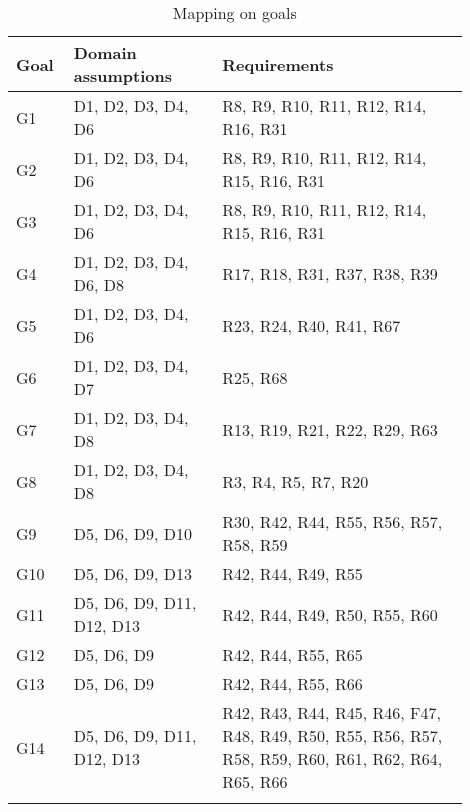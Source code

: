 \begin{center}
    \begin{longtable}[H]{|p{0.1\linewidth}|p{0.3\linewidth}|p{0.5\linewidth}|}
     \hline
     \textbf{Goal} & \textbf{Domain assumptions} & \textbf{Requirements}\\
     \hline
     G1 & D1, D2, D3, D4, D6 
        & R8, R9, R10, R11, R12, R14, R16, R31\\
     \hline
     G2 & D1, D2, D3, D4, D6  
        & R8, R9, R10, R11, R12, R14, R15, R16, R31\\
     \hline
     G3 & D1, D2, D3, D4, D6 
        & R8, R9, R10, R11, R12, R14, R15, R16, R31\\
     \hline
     G4 & D1, D2, D3, D4, D6, D8 
        & R17, R18, R31, R37, R38, R39 \\
     \hline
     G5 & D1, D2, D3, D4, D6 
        & R23, R24, R40, R41, R67\\
     \hline
     G6 & D1, D2, D3, D4, D7 
        & R25, R68\\
     \hline
     G7 & D1, D2, D3, D4, D8
        & R13, R19, R21, R22, R29, R63\\
     \hline
     G8 & D1, D2, D3, D4, D8
        & R3, R4, R5, R7, R20\\
     \hline
     G9 & D5, D6, D9, D10
        & R30, R42, R44, R55, R56, R57, R58, R59\\
     \hline
     G10 & D5, D6, D9, D13
        & R42, R44, R49, R55\\
     \hline
     G11 & D5, D6, D9, D11, D12, D13
        & R42, R44, R49, R50, R55, R60\\
     \hline
      G12 & D5, D6, D9
        & R42, R44, R55, R65\\
     \hline
      G13 & D5, D6, D9
        & R42, R44, R55, R66\\
     \hline
     G14 & D5, D6, D9, D11, D12, D13
        & R42, R43, R44, R45, R46, F47, R48, R49, R50, R55, R56, R57, R58, R59, R60, R61, R62, R64, R65, R66 \\
     \hline
    \caption{Mapping on goals}
    \label{tab:Mapping on goals}
    \end{longtable}
\end{center}

